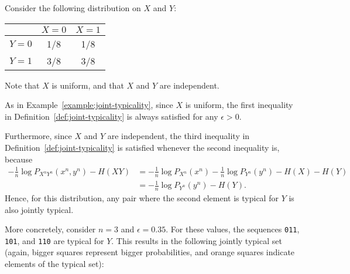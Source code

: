 \begin{example}\label{example:jointly-typical-2}
\newcommand{\mysquare}[4]{%
	\def\size{#2}
	\def\x{#4}
	\def\y{#3}
	\fill[#1] (\x-\size*0.5, 7-\y-\size*0.5) rectangle (\x+\size*0.5, 7-\y+\size*0.5);
}


Consider the following distribution on $X$ and $Y$:
\begin{center}
\begin{tabular}{c || c | c |}
&$X=0$&$X=1$\\
\hline
\hline
$Y=0$&1/8&1/8\\
$Y=1$&3/8&3/8\\
\end{tabular}
\end{center}
Note that $X$ is uniform, and that $X$ and $Y$ are independent.

As in Example~\ref{example:joint-typicality}, since $X$ is uniform, the first inequality in Definition~\ref{def:joint-typicality} is always satisfied for any $\epsilon > 0$.

Furthermore, since $X$ and $Y$ are independent, the third inequality in Definition~\ref{def:joint-typicality} is satisfied whenever the second inequality is, because
\begin{align*}
-\frac{1}{n}\log P_{X^nY^n}(x^n,y^n) - H(XY) &= -\frac{1}{n}\log P_{X^n}(x^n) - \frac{1}{n}\log P_{Y^n}(y^n) - H(X) - H(Y)\\
&= -\frac{1}{n}\log P_{Y^n}(y^n) - H(Y).
\end{align*}
Hence, for this distribution, any pair where the second element is typical for $Y$ is also jointly typical.

More concretely, consider $n = 3$ and $\epsilon = 0.35$. For these values, the sequences \texttt{011}, \texttt{101}, and \texttt{110} are typical for $Y$. This results in the following jointly typical set (again, bigger squares represent bigger probabilities, and orange squares indicate elements of the typical set):

\begin{center}
\end{center}
\end{example}
